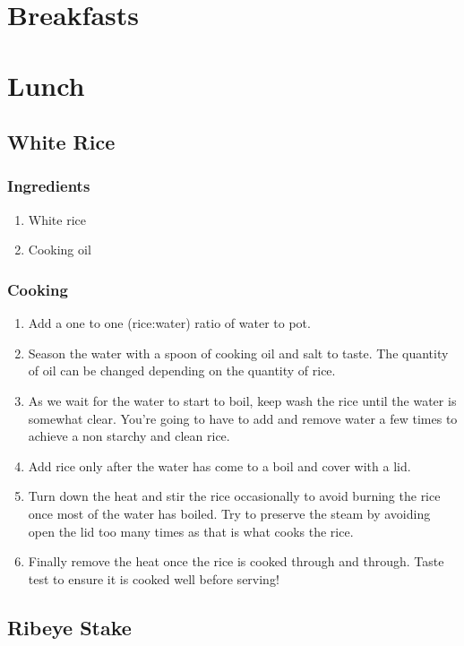 
\chapter{Breakfasts}

\chapter{Lunch}
\section{White Rice}
\subsection{Ingredients}
\begin{enumerate}
    \item White rice
    \item Cooking oil
\end{enumerate}
\subsection{Cooking}
\begin{enumerate}
    \item Add a one to one (rice:water) ratio of water to pot.
    \item Season the water with a spoon of cooking oil and salt to taste. The quantity of oil can be changed depending on the quantity of rice.
    \item As we wait for the water to start to boil, keep wash the rice until the water is somewhat clear. You're going to have to add and remove water a few times to achieve a non starchy and clean rice.
    \item Add rice only after the water has come to a boil and cover with a lid.
    \item Turn down the heat and stir the rice occasionally to avoid burning the rice once most of the water has boiled. Try to preserve the steam by avoiding open the lid too many times as that is what cooks the rice.
    \item Finally remove the heat once the rice is cooked through and through. Taste test to ensure it is cooked well before serving!
\end{enumerate}

\section{Ribeye Stake}
